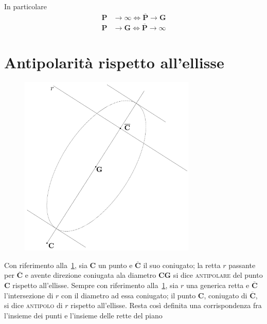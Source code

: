 In particolare 
\begin{align*}
\mathbf{P} &\rightarrow \infty \iff \overline{\mathbf{P}}\rightarrow \mathbf{G} \\
\mathbf{P} &\rightarrow \mathbf{G} \iff \overline{\mathbf{P}}\rightarrow \infty
\end{align*}
\section{Antipolarità rispetto all'ellisse}
\renewcommand{\thefigure}{6~-~4}
\begin{figure}[ht]
\centering
\includegraphics[width=0.75\textwidth]{Immagini/Parte_6/Figura6_4/Figura6_4.pdf}
\caption{}
\label{figura6-4}
\end{figure}
Con riferimento alla~\ref{figura6-4}, sia $\mathbf{C}$ un punto e $\overline{\mathbf{C}}$ il suo coniugato; la retta $r$ passante per $\overline{\mathbf{C}}$ e avente direzione coniugata ala diametro $\mathbf{C}\mathbf{G}$ si dice \textsc{antipolare} del punto $\mathbf{C}$ rispetto all'ellisse. Sempre con riferimento alla~\ref{figura6-4}, sia $r$ una generica retta e $\overline{\mathbf{C}}$ l'intersezione di $r$ con il diametro ad essa coniugato; il punto $\mathbf{C}$, coniugato di $\overline{\mathbf{C}}$, si dice \textsc{antipolo} di $r$ rispetto all'ellisse. Resta così definita una corrispondenza fra l'insieme dei punti e l'insieme delle rette del piano
